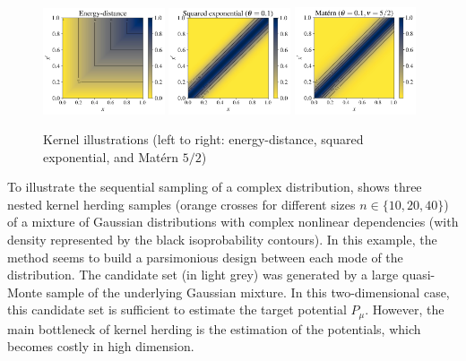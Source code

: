 \begin{figure}[!h]
\begin{center}
    \includegraphics[width=0.32\textwidth]{part2/figures/DCE/numerical_experiments/energy_kernel.jpg}
    \includegraphics[width=0.32\textwidth]{part2/figures/DCE/numerical_experiments/gaussian_kernel.jpg}
    \includegraphics[width=0.32\textwidth]{part2/figures/DCE/numerical_experiments/matern_kernel.jpg}
\end{center}
\caption{Kernel illustrations (left to right: energy-distance, squared exponential, and Matérn $5/2$)} \label{fig:kernels}
\end{figure}

To illustrate the sequential sampling of a complex distribution,  shows three nested kernel herding samples (orange crosses for different sizes $n\in\{10, 20, 40\}$) of a mixture of Gaussian distributions with complex nonlinear dependencies (with density represented by the black isoprobability contours). 
In this example, the method seems to build a parsimonious design between each mode of the distribution. 
The candidate set (in light grey) was generated by a large quasi-Monte sample of the underlying Gaussian mixture. 
In this two-dimensional case, this candidate set is sufficient to estimate the target potential $P_{\mu}$. %
However, the main bottleneck of kernel herding is the estimation of the potentials, which becomes costly in high dimension.

